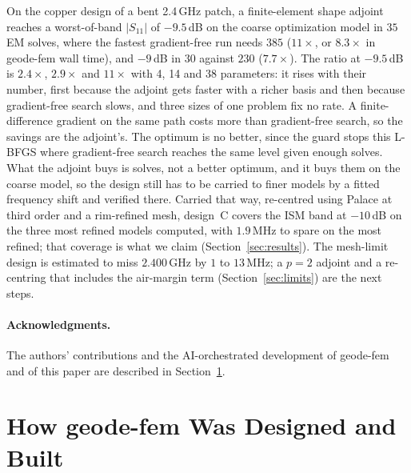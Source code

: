 \documentclass{anvil-paper}
\begin{document}
On the copper design of a bent 2.4\,GHz patch, a finite-element shape
adjoint reaches a worst-of-band $|S_{11}|$ of $-9.5$\,dB on the coarse
optimization model in $35$ EM solves, where the fastest gradient-free run
needs $385$ ($11\times$, or $8.3\times$ in geode-fem wall time), and $-9$\,dB
in $30$ against $230$ ($7.7\times$). The ratio at $-9.5$\,dB is $2.4\times$,
$2.9\times$ and $11\times$ with 4, 14 and 38 parameters: it rises with their
number, first because the adjoint gets faster with a richer basis and then
because gradient-free search slows, and three sizes of one problem fix no
rate. A finite-difference gradient on the same path costs more than
gradient-free search, so the savings are the adjoint's. The optimum is no
better, since the guard stops this L-BFGS where gradient-free search reaches
the same level given enough solves. What the adjoint buys is solves, not a
better optimum, and it buys them on the coarse model, so the design still
has to be carried to finer models by a fitted frequency shift and verified
there. Carried that way, re-centred using Palace at third order and a
rim-refined mesh, design~C covers the ISM band at $-10$\,dB on the three
most refined models computed, with $1.9$\,MHz to spare on the most
refined; that coverage is what we claim (Section~\ref{sec:results}). The
mesh-limit design is estimated to miss $2.400$\,GHz by $1$ to $13$\,MHz; a
$p = 2$ adjoint and a re-centring that includes the air-margin term
(Section~\ref{sec:limits}) are the next steps.

\paragraph{Acknowledgments.}
The authors' contributions and the AI-orchestrated development of
geode-fem and of this paper are described in Section~\ref{sec:built}.

\section{How geode-fem Was Designed and Built}
\label{sec:built}
\end{document}
